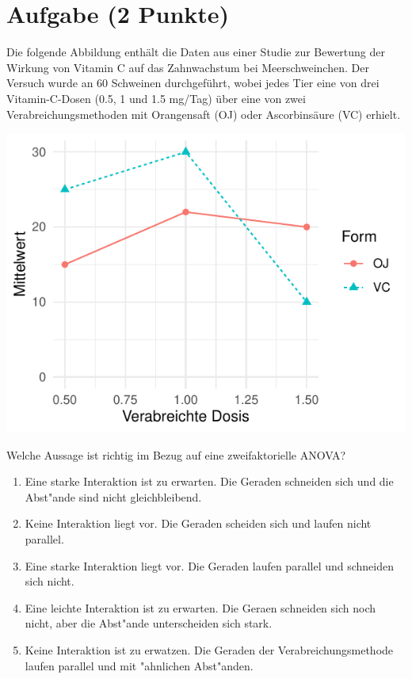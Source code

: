 \documentclass[a4paper, 10pt]{scrartcl}\usepackage[]{graphicx}\usepackage[]{xcolor}
\makeatletter
\def\maxwidth{ %
  \ifdim\Gin@nat@width>\linewidth
    \linewidth
  \else
    \Gin@nat@width
  \fi
}
\makeatother
\begin{document}
\section{Aufgabe \hfill (2 Punkte)}

Die folgende Abbildung enth{\"a}lt die Daten aus einer Studie zur
Bewertung der Wirkung von Vitamin C auf das Zahnwachstum bei
Meerschweinchen. Der Versuch wurde an 60 Schweinen durchgef{\"u}hrt, wobei
jedes Tier eine von drei Vitamin-C-Dosen (0.5, 1 und 1.5 mg/Tag) {\"u}ber eine
von zwei Verabreichungsmethoden mit Orangensaft (OJ)  oder
Ascorbins{\"a}ure (VC) erhielt. 



{\centering \includegraphics[width=\maxwidth]{img/mc-anova-02-a-1} 

}




Welche Aussage ist richtig im Bezug auf eine zweifaktorielle ANOVA?



\begin{enumerate}
\item [\textbf{A} \msquare] Eine starke Interaktion ist zu erwarten. Die Geraden schneiden sich und die Abst{"a}nde sind nicht gleichbleibend.
\item [\textbf{B} \msquare] Keine Interaktion liegt vor. Die Geraden scheiden sich und laufen nicht parallel.
\item [\textbf{C} \msquare] Eine starke Interaktion liegt vor. Die Geraden laufen parallel und schneiden sich nicht.
\item [\textbf{D} \msquare] Eine leichte Interaktion ist zu erwarten. Die Geraen schneiden sich noch nicht, aber die Abst{"a}nde unterscheiden sich stark.
\item [\textbf{E} \msquare] Keine Interaktion ist zu erwatzen. Die Geraden der Verabreichungsmethode laufen parallel und mit {"a}hnlichen Abst{"a}nden.
\end{enumerate} 
\end{document}
